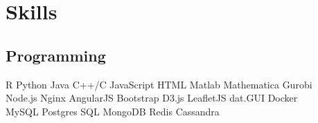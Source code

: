 \documentclass[]{Current-DS}
\begin{document}
\begin{minipage}[t]{0.33\textwidth}



\section{Skills}
\subsection{Programming}
R \textbullet{} Python \textbullet{} Java \textbullet{}  C++/C \textbullet{} JavaScript \textbullet{} HTML \textbullet{} Matlab \textbullet{} Mathematica \textbullet{} Gurobi\\
Node.js \textbullet{} Nginx \textbullet{} AngularJS \textbullet{} Bootstrap \textbullet{} D3.js \textbullet{} LeafletJS \textbullet{} dat.GUI \textbullet{} Docker \\
MySQL \textbullet{} Postgres SQL\textbullet{} MongoDB \textbullet{} Redis \textbullet{} Cassandra
\sectionsep

%
%

\end{minipage} 
\hfill
\end{document}
